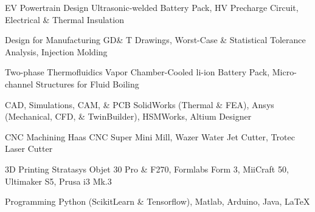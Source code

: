


\begin{cvskills}





\cvskill
{EV Powertrain Design}
{Ultrasonic-welded Battery Pack, HV Precharge Circuit, Electrical \& Thermal Insulation}

\cvskill
{Design for Manufacturing}
{GD\& T Drawings, Worst-Case \& Statistical Tolerance Analysis, Injection Molding}

\cvskill
{Two-phase Thermofluidics}
{Vapor Chamber-Cooled li-ion Battery Pack, Micro-channel Structures for Fluid Boiling}

\cvskill
{CAD, Simulations, CAM, \& PCB} %
{SolidWorks (Thermal \& FEA), Ansys (Mechanical, CFD, \& TwinBuilder), HSMWorks,  Altium Designer} %

\cvskill
{CNC Machining}
{Haas CNC Super Mini Mill, Wazer Water Jet Cutter, Trotec Laser Cutter}

\cvskill
{3D Printing} %
{Stratasys Objet 30 Pro \& F270, Formlabs Form 3, MiiCraft 50, Ultimaker S5, Prusa i3 Mk.3} %

\cvskill
{Programming} %
{Python (ScikitLearn \& Tensorflow), Matlab, Arduino, Java, LaTeX} %



\end{cvskills}